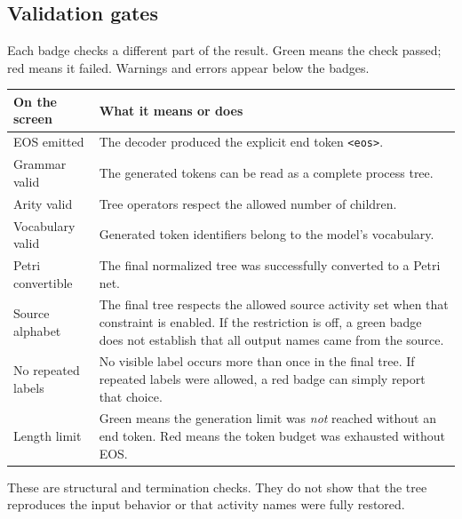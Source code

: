 \documentclass[11pt,a4paper]{article}
\makeatletter
\newcommand{\code}[1]{\nolinkurl{#1}}
\newenvironment{controls}{%
  \small\begin{longtable}{@{}>{\raggedright\arraybackslash}p{.34\linewidth}
    >{\raggedright\arraybackslash}p{.62\linewidth}@{}}
  \toprule\textbf{On the screen} & \textbf{What it means or does}\\\midrule\endhead
  \bottomrule\endfoot
}{\end{longtable}\normalsize}
\makeatother
\begin{document}
\subsection{Validation gates}
Each badge checks a different part of the result. Green means the check passed;
red means it failed. Warnings and errors appear below the badges.
\begin{controls}
EOS emitted & The decoder produced the explicit end token \code{<eos>}.\\
Grammar valid & The generated tokens can be read as a complete process tree.\\
Arity valid & Tree operators respect the allowed number of children.\\
Vocabulary valid & Generated token identifiers belong to the model's vocabulary.\\
Petri convertible & The final normalized tree was successfully converted to a
Petri net.\\
Source alphabet & The final tree respects the allowed source activity set
when that constraint is enabled. If the restriction is off, a green badge
does not establish that all output names came from the source.\\
No repeated labels & No visible label occurs more than once in the final tree.
If repeated labels were allowed, a red badge can simply report that choice.\\
Length limit & Green means the generation limit was \emph{not} reached without
an end token. Red means the token budget was exhausted without EOS.\\
\end{controls}

These are structural and termination checks. They do not show that the tree
reproduces the input behavior or that activity names were fully restored.
\end{document}
